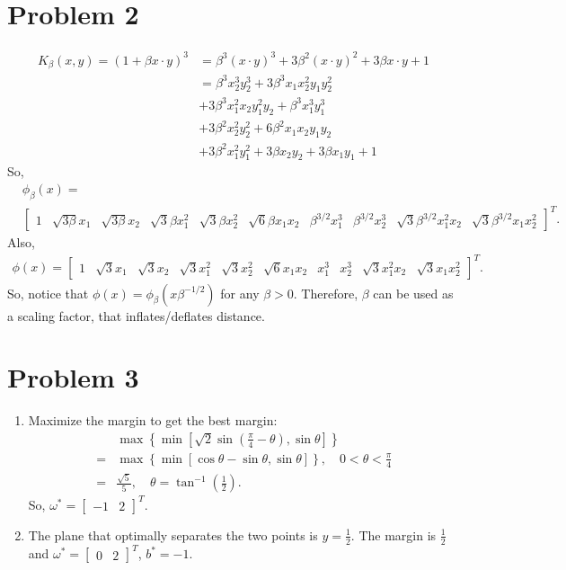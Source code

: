 \documentclass[11pt]{article}
\newcommand{\solution}[1]{{{\color{blue}{\bf Solution:} {#1}}}}
\begin{document}
\section{Problem 2}
\solution{
  \begin{align*}
    K_\beta (x, y) = (1+\beta x \cdot y)^3
    &= \beta^3(x \cdot y)^3 + 3\beta^2 (x \cdot y)^2 + 3\beta x \cdot y + 1\\
    &= \beta^3x_2^3y_2^3 + 3\beta^3x_1x_2^2y_1y_2^2\\
    &+3\beta^3x_1^2x_2y_1^2y_2 + \beta^3x_1^3y_1^3\\
    &+ 3\beta^2x_2^2y_2^2 + 6\beta^2x_1x_2y_1y_2\\
    &+3\beta^2x_1^2y_1^2 + 3\beta x_2y_2 + 3\beta x_1y_1 + 1
  \end{align*}
  So,
  \begin{align*}
    &\phi_\beta (x) =\\ &\begin{bmatrix}1 &\sqrt{3\beta}x_1 &\sqrt{3\beta}x_2 &\sqrt{3}\beta x_1^2 &\sqrt{3}\beta x_2^2 &\sqrt{6}\beta x_1x_2 &\beta^{3/2}x_1^3 &\beta^{3/2}x_2^3 &\sqrt{3}\beta^{3/2}x_1^2x_2 &\sqrt{3}\beta^{3/2}x_1x_2^2\end{bmatrix}^T.
  \end{align*}
  Also,
  \begin{align*}
    \phi (x) =\begin{bmatrix}1 &\sqrt{3}x_1 &\sqrt{3}x_2 &\sqrt{3} x_1^2 &\sqrt{3} x_2^2 &\sqrt{6} x_1x_2 &x_1^3 &x_2^3 &\sqrt{3}x_1^2x_2 &\sqrt{3}x_1x_2^2\end{bmatrix}^T.
  \end{align*}  
    So, notice that $\phi(x) = \phi_\beta(x\beta^{-1/2})$ for any $\beta > 0$. Therefore, $\beta$
      can be used as a scaling factor, that inflates/deflates distance.
}
\newpage
\section{Problem 3}

  \begin{enumerate}
  \item \solution{Maximize the margin to get the best margin:
    \begin{align*}
      &\max\left\{ \min \left[ \sqrt{2} \sin \left( \frac{\pi}{4} - \theta\right), \sin \theta\right]\right\}\\
      = &\max\left\{ \min \left[ \cos \theta - \sin \theta, \sin \theta\right]\right\}, \quad 0 < \theta < \frac{\pi}{4}\\
      = &\frac{\sqrt{5}}{5}, \quad \theta = \tan^{-1}\left(\frac{1}{2}\right).
    \end{align*}
    So, $\omega^* = \begin{bmatrix}-1 &2\end{bmatrix}^T$.}
  \item \solution{The plane that optimally separates the two points is
    $y = \frac{1}{2}$. The margin is $\frac{1}{2}$ and
    $\omega^* = \begin{bmatrix}0 &2\end{bmatrix}^T$, $b^*=-1$.}
  \end{enumerate}
\newpage
\end{document}

